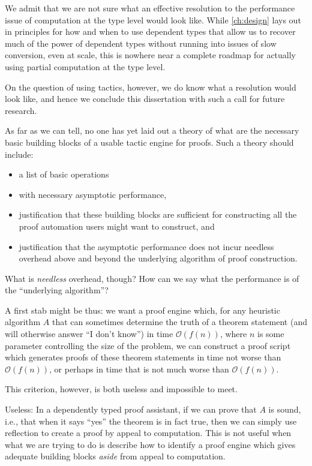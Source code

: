We admit that we are not sure what an effective resolution to the performance issue of computation at the type level would look like.
While \autoref{ch:design} lays out in  principles for how and when to use dependent types that allow us to recover much of the power of dependent types without running into issues of slow conversion, even at scale, this is nowhere near a complete roadmap for actually using partial computation at the type level.

On the question of using tactics, however, we do know what a resolution would look like, and hence we conclude this dissertation with such a call for future research.

As far as we can tell, no one has yet laid out a theory of what are the necessary basic building blocks of a usable tactic engine for proofs.
Such a theory should include:
\begin{itemize}
\item
  a list of basic operations
\item
  with necessary asymptotic performance,
\item
  justification that these building blocks are sufficient for constructing all the proof automation users might want to construct, and
\item
  justification that the asymptotic performance does not incur needless overhead above and beyond the underlying algorithm of proof construction.
\end{itemize}

What is \emph{needless} overhead, though?
How can we say what the performance is of the ``underlying algorithm''?

A first stab might be thus: we want a proof engine which, for any heuristic algorithm $A$ that can sometimes determine the truth of a theorem statement (and will otherwise answer ``I don't know'') in time $\mathcal O(f(n))$, where $n$ is some parameter controlling the size of the problem, we can construct a proof script which generates proofs of these theorem statements in time not worse than $\mathcal O(f(n))$, or perhaps in time that is not much worse than $\mathcal O(f(n))$.

This criterion, however, is both useless and impossible to meet.

Useless:
In a dependently typed proof assistant, if we can prove that $A$ is sound, i.e., that when it says ``yes'' the theorem is in fact true, then we can simply use reflection to create a proof by appeal to computation.
This is not useful when what we are trying to do is describe how to identify a proof engine which gives adequate building blocks \emph{aside} from appeal to computation.

